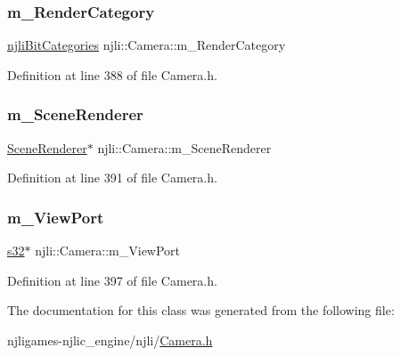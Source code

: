 \subsubsection{\texorpdfstring{m\+\_\+\+Render\+Category}{m\_RenderCategory}}
{\footnotesize\ttfamily \mbox{\hyperlink{namespacenjli_af7b302a2b48bb644f85c88080925c974}{njli\+Bit\+Categories}} njli\+::\+Camera\+::m\+\_\+\+Render\+Category\hspace{0.3cm}{\ttfamily [private]}}



Definition at line 388 of file Camera.\+h.

\mbox{\label{classnjli_1_1_camera_aa5b56fb8e1f66bcc1e97cc06708d438e}} 
\subsubsection{\texorpdfstring{m\+\_\+\+Scene\+Renderer}{m\_SceneRenderer}}
{\footnotesize\ttfamily \mbox{\hyperlink{classnjli_1_1_camera_aae6efa51fde36cf2c0759009ba7b19c0}{Scene\+Renderer}}$\ast$ njli\+::\+Camera\+::m\+\_\+\+Scene\+Renderer\hspace{0.3cm}{\ttfamily [private]}}



Definition at line 391 of file Camera.\+h.

\mbox{\label{classnjli_1_1_camera_a0ac4d128631b54a0a5ab1d023c565b73}} 
\subsubsection{\texorpdfstring{m\+\_\+\+View\+Port}{m\_ViewPort}}
{\footnotesize\ttfamily \mbox{\hyperlink{_util_8h_aa62c75d314a0d1f37f79c4b73b2292e2}{s32}}$\ast$ njli\+::\+Camera\+::m\+\_\+\+View\+Port\hspace{0.3cm}{\ttfamily [private]}}



Definition at line 397 of file Camera.\+h.



The documentation for this class was generated from the following file\+:\begin{DoxyCompactItemize}
\item 
njligames-\/njlic\+\_\+engine/njli/\mbox{\hyperlink{_camera_8h}{Camera.\+h}}\end{DoxyCompactItemize}
